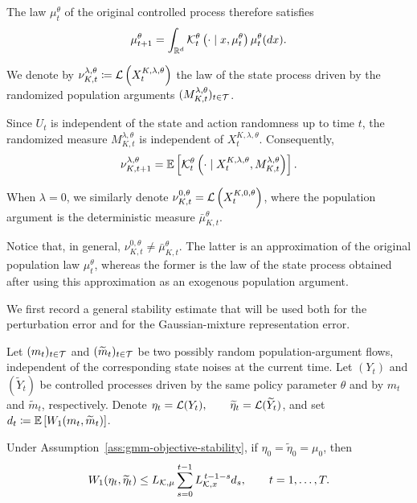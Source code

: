 The law $\mu_t^\theta$ of the original controlled process therefore satisfies
\begin{align}
    \mu_{t+1}^\theta = \int_{\mathbb{R}^d} {\cal K}_t^\theta \left( \cdot \mid x,\mu_t^\theta \right) \mu_t^\theta(dx).
    \label{eq:gmm-original-flow}
\end{align}

We denote by $\nu_{K,t}^{\lambda,\theta} \coloneqq {\cal L} \left( X_t^{K,\lambda,\theta} \right)$ the law of the state process driven by the randomized population arguments $(M_{K,t}^{\lambda,\theta})_{t\in{\cal T}}$.

Since $U_t$ is independent of the state and action randomness up to time $t$, the randomized measure $M_{K,t}^{\lambda,\theta}$ is independent of $X_t^{K,\lambda,\theta}$. Consequently,
\begin{align}
    \nu_{K,t+1}^{\lambda,\theta} = \mathbb{E} \left[ {\cal K}_t^\theta \left( \cdot \mid X_t^{K,\lambda,\theta}, M_{K,t}^{\lambda,\theta} \right) \right].
    \label{eq:gmm-perturbed-flow}
\end{align}

When $\lambda=0$, we similarly denote $\nu_{K,t}^{0,\theta} = {\cal L} \left( X_t^{K,0,\theta} \right)$, where the population argument is the deterministic measure $\bar\mu_{K,t}^\theta$.

Notice that, in general, $\nu_{K,t}^{0,\theta}\neq\bar\mu_{K,t}^\theta$. The latter is an approximation of the original population law $\mu_t^\theta$, whereas the former is the law of the state process obtained after using this approximation as an exogenous population argument.

We first record a general stability estimate that will be used both for the perturbation error and for the Gaussian-mixture representation error.

Let $(m_t)_{t\in{\cal T}}$ and $(\widetilde m_t)_{t\in{\cal T}}$ be two possibly random population-argument flows, independent of the corresponding state noises at the current time. Let $(Y_t)$ and $(\widetilde Y_t)$ be controlled processes driven by the same policy parameter $\theta$ and by $m_t$ and $\widetilde m_t$, respectively. Denote $\eta_t={\cal L}(Y_t), \qquad \widetilde\eta_t={\cal L}(\widetilde Y_t)$, and set $d_t\coloneqq\mathbb{E}\left[W_1(m_t,\widetilde m_t)\right]$.

\begin{lemma}
    \label{lem:gmm-state-stability}
    Under Assumption~\ref{ass:gmm-objective-stability}, if $\eta_0=\widetilde\eta_0=\mu_0$, then
    \begin{align}
        W_1(\eta_t,\widetilde\eta_t) \leq L_{{\cal K},\mu} \sum_{s=0}^{t-1} L_{{\cal K},x}^{\,t-1-s} d_s, \qquad t=1,\ldots,T.
        \label{eq:gmm-state-stability}
    \end{align}
\end{lemma}

